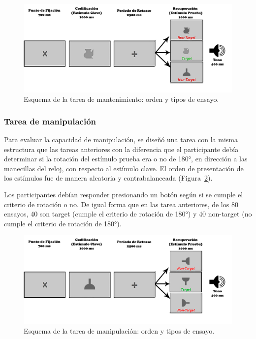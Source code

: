 \documentclass[12pt,letterpaper,final]{article}
\begin{document}
\begin{figure}[h]
	\centering
	\includegraphics[scale=0.35]{str-mt.png}
	\caption{Esquema de la tarea de mantenimiento: orden y tipos de ensayo.}
	\label{fig:str-mt}
\end{figure}

\subsubsection{Tarea de manipulación}
Para evaluar la capacidad de manipulación, se diseñó una tarea con la misma estructura que las tareas anteriores con la diferencia que el participante debía determinar si la rotación del estímulo prueba era o no de \ang{180}, en dirección a las manecillas del reloj, con respecto al estímulo clave. El orden de presentación de los estímulos fue de manera aleatoria y contrabalanceada (Figura~\ref{fig:str-mp}). 

Los participantes debían responder presionando un botón según si se cumple el criterio de rotación o no.
De igual forma que en las tarea anteriores, de los 80 ensayos, 40 son target (cumple el criterio de rotación de \ang{180}) y 40 non-target (no cumple el criterio de rotación de  \ang{180}). %

\begin{figure}[h!]
	\centering
	\includegraphics[scale=0.09]{str-mp.png}
	\caption{Esquema de la tarea de manipulación: orden y tipos de ensayo.}
	\label{fig:str-mp}
\end{figure}
\end{document}
